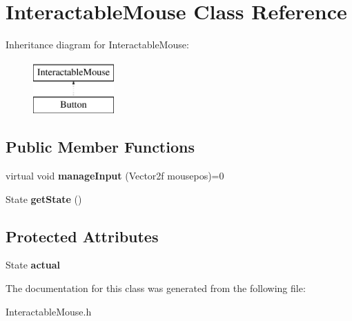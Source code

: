 \hypertarget{class_interactable_mouse}{}\section{Interactable\+Mouse Class Reference}
\label{class_interactable_mouse}
Inheritance diagram for Interactable\+Mouse\+:\begin{figure}[H]
\begin{center}
\leavevmode
\includegraphics[height=2.000000cm]{class_interactable_mouse}
\end{center}
\end{figure}
\subsection*{Public Member Functions}
\begin{DoxyCompactItemize}
\item 
\mbox{\label{class_interactable_mouse_a69ca3192e3bc2aa14a451e746d6585ca}} 
virtual void {\bfseries manage\+Input} (Vector2f mousepos)=0
\item 
\mbox{\label{class_interactable_mouse_a751abe347bccf85c7c5d0c87d455879e}} 
State {\bfseries get\+State} ()
\end{DoxyCompactItemize}
\subsection*{Protected Attributes}
\begin{DoxyCompactItemize}
\item 
\mbox{\label{class_interactable_mouse_a6a207a594d640d523e2f5c3a80b9dfd8}} 
State {\bfseries actual}
\end{DoxyCompactItemize}


The documentation for this class was generated from the following file\+:\begin{DoxyCompactItemize}
\item 
Interactable\+Mouse.\+h\end{DoxyCompactItemize}
